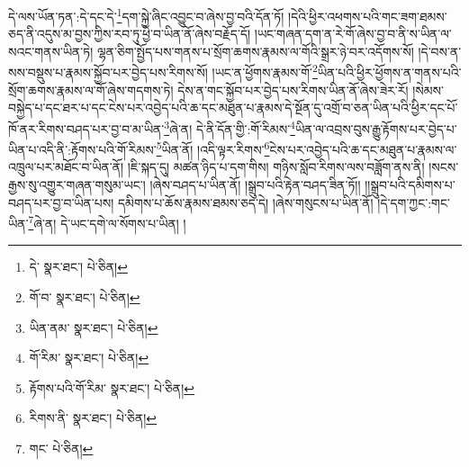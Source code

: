 དེ་ལས་ཡོན་ཏན་:དེ་དང་དེ་\footnote{དེ་  སྣར་ཐང་།  པེ་ཅིན། }དག་སྐྱེ་ཞིང་འབྱུང་བ་ཞེས་བྱ་བའི་དོན་ཏོ། །དེའི་ཕྱིར་འཕགས་པའི་གང་ཟག་ཐམས་ཅད་ནི་འདུས་མ་བྱས་ཀྱིས་རབ་ཏུ་ཕྱེ་བ་ཡིན་ནོ་ཞེས་བརྗོད་དོ། །ཡང་གཞན་དག་ན་རེ་གོ་ཞེས་བྱ་བ་ནི་ས་ཡིན་ལ་སའང་གནས་ཡིན་ཏེ། ལྷན་ཅིག་སྤྱོད་པས་གནས་པ་སྲོག་ཆགས་རྣམས་ལ་གོའི་སྒྲར་ཉེ་བར་འདོགས་སོ། །དེ་བས་ན་སས་བསྡུས་པ་རྣམས་སྐྱོབ་པར་བྱེད་པས་རིགས་སོ། །ཡང་ན་ཕྱོགས་རྣམས་གོ་\footnote{གོ་བ་  སྣར་ཐང་།  པེ་ཅིན། }ཡིན་པའི་ཕྱིར་ཕྱོགས་ན་གནས་པའི་སྲོག་ཆགས་རྣམས་ལ་གོ་ཞེས་གདགས་ཏེ། དེས་ན་གང་སྐྱོབ་པར་བྱེད་པས་རིགས་ཡིན་ནོ་ཞེས་ཟེར་རོ། །སེམས་བསྐྱེད་པ་དང་ཐར་པ་དང་ངེས་པར་འབྱེད་པའི་ཆ་དང་མཐུན་པ་རྣམས་དེ་སྔོན་དུ་འགྲོ་བ་ཅན་ཡིན་པའི་ཕྱིར་དང་པོ་ཁོ་ནར་རིགས་བཤད་པར་བྱ་བ་མ་ཡིན་\footnote{ཡིན་ནམ་  སྣར་ཐང་།  པེ་ཅིན། }ཞེ་ན། དེ་ནི་དོན་གྱི་:གོ་རིམས་\footnote{གོ་རིམ་  སྣར་ཐང་།  པེ་ཅིན། }ཡིན་ལ་འབྲས་བུས་རྒྱུ་རྟོགས་པར་བྱེད་པ་ཡིན་པ་འདི་ནི་:རྟོགས་པའི་གོ་རིམས་\footnote{རྟོགས་པའི་གོ་རིམ་  སྣར་ཐང་།  པེ་ཅིན། }ཡིན་ནོ། །འདི་ལྟར་རིགས་\footnote{རིགས་ནི་  སྣར་ཐང་།  པེ་ཅིན། }ངེས་པར་འབྱེད་པའི་ཆ་དང་མཐུན་པ་རྣམས་ལ་འཁྲུལ་པར་མཐོང་བ་ཡིན་ནོ། །ཇི་སྐད་དུ། མཚན་ཉིད་པ་དག་གིས། གཉིས་སློབ་རིགས་ལས་བཟློག་ནས་ནི། །སངས་རྒྱས་སུ་འགྱུར་གཞན་གསུམ་ཡང་། །ཞེས་བཤད་པ་ཡིན་ནོ། །སྒྲུབ་པའི་རྟེན་བཤད་ཟིན་ཏོ།། །།སྒྲུབ་པའི་དམིགས་པ་བཤད་པར་བྱ་བ་ཡིན་པས། དམིགས་པ་ཆོས་རྣམས་ཐམས་ཅད་དེ། །ཞེས་གསུངས་པ་ཡིན་ནོ། །དེ་དག་ཀྱང་:གང་ཡིན་\footnote{གང་  པེ་ཅིན། }ཞེ་ན། དེ་ཡང་དགེ་ལ་སོགས་པ་ཡིན། །
